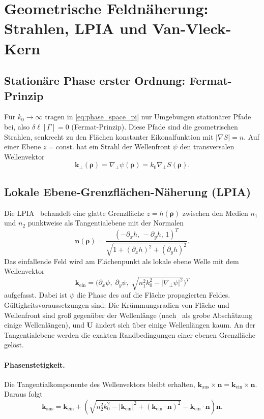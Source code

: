 \documentclass[11pt,a4paper]{scrartcl}
\theoremstyle{insightstyle}
\newcommand{\grad}{\nabla_{\!\perp}}
\newcommand{\rh}{\bm{\rho}}
\newcommand{\kp}{\bm{k}_\perp}
\begin{document}
\section{Geometrische Feldnäherung: Strahlen, LPIA und Van-Vleck-Kern}\label{sec:rays}

\subsection{Stationäre Phase erster Ordnung: Fermat-Prinzip}
Für $k_0\to\infty$ tragen in \eqref{eq:phase_space_pi} nur Umgebungen stationärer Pfade bei, also $\delta\ell[\Gamma]=0$ (Fermat-Prinzip). Diese Pfade sind die geometrischen Strahlen, senkrecht zu den Flächen konstanter Eikonalfunktion mit $|\nabla S|=n$. Auf einer Ebene $z=\text{const.}$ hat ein Strahl der Wellenfront $\psi$ den transversalen Wellenvektor
\begin{equation}
    \kp(\rh) = \grad\psi(\rh) = k_0\grad S(\rh).
    \label{eq:local_k}
\end{equation}

\subsection{Lokale Ebene-Grenzflächen-Näherung (LPIA)}
Die LPIA~\cite{vonpfeil2000} behandelt eine glatte Grenzfläche $z=h(\rh)$ zwischen den Medien $n_1$ und $n_2$ punktweise als Tangentialebene mit der Normalen
\begin{equation}
    \bm n(\rh) = \frac{(-\partial_xh,\,-\partial_yh,\,1)^T}{\sqrt{1+(\partial_xh)^2+(\partial_yh)^2}}.
\end{equation}
Das einfallende Feld wird am Flächenpunkt als lokale ebene Welle mit dem Wellenvektor
\begin{equation}
    \bm k_\text{ein} = \Big(\partial_x\psi,\;\partial_y\psi,\;\sqrt{n_1^2k_0^2-|\grad\psi|^2}\Big)^T
\end{equation}
aufgefasst. Dabei ist $\psi$ die Phase des auf die Fläche propagierten Feldes. Gültigkeitsvoraussetzungen sind: Die Krümmungsradien von Fläche und Wellenfront sind groß gegenüber der Wellenlänge (nach~\cite{vonpfeil2000} als grobe Abschätzung einige Wellenlängen), und $\bm U$ ändert sich über einige Wellenlängen kaum. An der Tangentialebene werden die exakten Randbedingungen einer ebenen Grenzfläche gelöst.

\paragraph{Phasenstetigkeit.} Die Tangentialkomponente des Wellenvektors bleibt erhalten, $\bm k_\text{aus}\times\bm n=\bm k_\text{ein}\times\bm n$. Daraus folgt
\begin{equation}
    \bm k_\text{aus} = \bm k_\text{ein} + \left(\sqrt{n_2^2k_0^2-|\bm k_\text{ein}|^2+(\bm k_\text{ein}\cdot\bm n)^2}-\bm k_\text{ein}\cdot\bm n\right)\bm n .
\end{equation}
\end{document}
